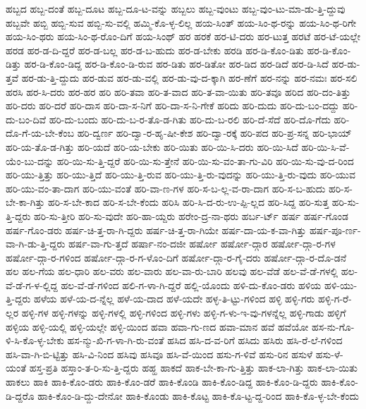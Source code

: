 {ಹಬ್ಬದ
ಹಬ್ಬ-ದಂತೆ
ಹಬ್ಬ-ದೂಟ
ಹಬ್ಬ-ದೂ-ಟ-ವನ್ನು
ಹಬ್ಬಲು
ಹಬ್ಬ-ವುಂಟು
ಹಬ್ಬ-ವುಂ-ಟು-ಮಾ-ಡು-ತ್ತಿ-ದ್ದುವು
ಹಬ್ಬವೇ
ಹಬ್ಬಿ
ಹಬ್ಬಿ-ಸುವ
ಹಬ್ಬಿ-ಸು-ವಲ್ಲಿ
ಹಮ್ಮಿ-ಕೊ-ಳ್ಳ-ಲಿಲ್ಲ
ಹಯ-ಸಿಂತ್
ಹಯ-ಸಿಂ-ಥ-ರನ್ನು
ಹಯ-ಸಿಂ-ಥ-ರಿಗೇ
ಹಯ-ಸಿಂ-ಥರು
ಹಯ-ಸಿಂ-ಥ-ರೊಂ-ದಿಗೆ
ಹಯ-ಸಿಂಥ್
ಹರ
ಹರಕೆ
ಹರ-ಟಿ-ದರು
ಹರ-ಟುತ್ತ
ಹರಟೆ
ಹರ-ಟೆ-ಯಲ್ಲೇ
ಹರಡ
ಹರ-ಡ-ದಿ-ದ್ದರೆ
ಹರ-ಡ-ಬಲ್ಲ
ಹರ-ಡ-ಬ-ಹುದು
ಹರ-ಡ-ಬೇಕು
ಹರಡಿ
ಹರ-ಡಿ-ಕೊಂ-ಡಿತು
ಹರ-ಡಿ-ಕೊಂ-ಡಿತ್ತು
ಹರ-ಡಿ-ಕೊಂ-ಡಿದ್ದ
ಹರ-ಡಿ-ಕೊಂ-ಡಿ-ರುವ
ಹರ-ಡಿತು
ಹರ-ಡಿತೋ
ಹರ-ಡಿದ
ಹರ-ಡಿದೆ
ಹರ-ಡಿ-ಸಿದೆ
ಹರ-ಡು-ತ್ತವೆ
ಹರ-ಡು-ತ್ತಿ-ದ್ದುದು
ಹರ-ಡುವ
ಹರ-ಡು-ವಲ್ಲಿ
ಹರ-ಡು-ವು-ದ-ಕ್ಕಾಗಿ
ಹರ-ಣೆಗೆ
ಹರ-ನನ್ನು
ಹರ-ನಮಃ
ಹರ-ಸಲಿ
ಹರಸಿ
ಹರ-ಸಿ-ದರು
ಹರ-ಹರ
ಹರಿ
ಹರಿ-ತವಾ
ಹರಿ-ತ-ವಾದ
ಹರಿ-ತ-ವಾ-ಯಿತು
ಹರಿ-ತವೂ
ಹರಿದ
ಹರಿ-ದಂ-ತಿತ್ತು
ಹರಿ-ದರು
ಹರಿ-ದರೆ
ಹರಿ-ದಾಸ
ಹರಿ-ದಾ-ಸ-ನಿಗೆ
ಹರಿ-ದಾ-ಸ-ನಿ-ಗೇಕೆ
ಹರಿದು
ಹರಿ-ದುದು
ಹರಿ-ದು-ಬಂ-ದದ್ದು
ಹರಿ-ದು-ಬಂ-ದಿವೆ
ಹರಿ-ದು-ಬಂದು
ಹರಿ-ದು-ಬ-ರ-ತೊ-ಡ-ಗಿತು
ಹರಿ-ದು-ಬ-ರಲಿ
ಹರಿ-ದೆ-ಸೆದೆ
ಹರಿ-ದೊ-ಗೆದು
ಹರಿ-ದೊ-ಗೆ-ಯ-ಬೇ-ಕೆಂಬ
ಹರಿ-ದ್ವರ್ಣ
ಹರಿ-ದ್ವಾ-ರ-ಹೃ-ಷೀ-ಕೇಶ
ಹರಿ-ದ್ವಾ-ರಕ್ಕೆ
ಹರಿ-ಪದ
ಹರಿ-ಪ್ರ-ಸನ್ನ
ಹರಿ-ಭಾಯ್
ಹರಿ-ಯ-ತೊ-ಡ-ಗಿತ್ತು
ಹರಿ-ಯದೆ
ಹರಿ-ಯ-ಬೇಕು
ಹರಿ-ಯಿತು
ಹರಿ-ಯಿ-ಸಿ-ದರು
ಹರಿ-ಯಿ-ಸಿದೆ
ಹರಿ-ಯಿ-ಸಿ-ವೆ-ಯೆಂ-ಬು-ದನ್ನು
ಹರಿ-ಯಿ-ಸು-ತ್ತಿ-ದ್ದರೆ
ಹರಿ-ಯಿ-ಸು-ತ್ತೇನೆ
ಹರಿ-ಯಿ-ಸು-ವಂ-ತಾ-ಗು-ವಿರಿ
ಹರಿ-ಯಿ-ಸು-ವು-ದ-ರಿಂದ
ಹರಿ-ಯು-ತ್ತಿತ್ತು
ಹರಿ-ಯು-ತ್ತಿದೆ
ಹರಿ-ಯು-ತ್ತಿ-ರುವ
ಹರಿ-ಯು-ತ್ತಿ-ರು-ವುದನ್ನು
ಹರಿ-ಯು-ತ್ತಿ-ರು-ವುದು
ಹರಿ-ಯುವ
ಹರಿ-ಯು-ವಂ-ತಾ-ದಾಗ
ಹರಿ-ಯು-ವಂತೆ
ಹರಿ-ವಾ-ಣ-ಗಳ
ಹರಿ-ಸ-ಬ-ಲ್ಲ-ವ-ರಾ-ದಾಗ
ಹರಿ-ಸ-ಬ-ಹುದು
ಹರಿ-ಸ-ಬೇ-ಕಾ-ಗಿತ್ತು
ಹರಿ-ಸ-ಬೇ-ಕಾದ
ಹರಿ-ಸ-ಬೇ-ಕೆಂದು
ಹರಿಸಿ
ಹರಿ-ಸಿ-ದ-ರು-ಉ-ಪ್ಪಿ-ಲ್ಲದ
ಹರಿ-ಸಿದ್ದ
ಹರಿ-ಸುತ್ತ
ಹರಿ-ಸು-ತ್ತಿ-ದ್ದರು
ಹರಿ-ಸು-ತ್ತೀರಿ
ಹರಿ-ಸು-ವುದೇ
ಹರಿ-ಹಾ-ಯ್ದರು
ಹರೇಂ-ದ್ರ-ನಾ-ಥರು
ಹರ್ಬ-ರ್ಟ್
ಹರ್ಷ
ಹರ್ಷ-ಗೊಂಡ
ಹರ್ಷ-ಗೊಂ-ಡರು
ಹರ್ಷ-ಚಿ-ತ್ತ-ರಾ-ಗಿ-ದ್ದರು
ಹರ್ಷ-ಚಿ-ತ್ತ-ರಾ-ಗಿಯೇ
ಹರ್ಷ-ದಾ-ಯ-ಕ-ವಾ-ಗಿತ್ತು
ಹರ್ಷ-ಪೂ-ರ್ಣ-ವಾ-ಗಿ-ಡು-ತ್ತಿ-ದ್ದರು
ಹರ್ಷ-ವಾ-ಗು-ತ್ತದೆ
ಹರ್ಷಾ-ನಂ-ದಜೀ
ಹರ್ಷೋ
ಹರ್ಷೋ-ದ್ಗಾರ
ಹರ್ಷೋ-ದ್ಗಾ-ರ-ಗಳ
ಹರ್ಷೋ-ದ್ಗಾ-ರ-ಗಳಿಂದ
ಹರ್ಷೋ-ದ್ಗಾ-ರ-ಗ-ಳೊಂ-ದಿಗೆ
ಹರ್ಷೋ-ದ್ಗಾ-ರ-ಗೈ-ದರು
ಹರ್ಷೋ-ದ್ಗಾ-ರ-ದೊ-ಡನೆ
ಹಲ
ಹಲ-ಗೆಯ
ಹಲ-ಧಾರಿ
ಹಲ-ವರು
ಹಲ-ವಾರು
ಹಲ-ವಾ-ರು-ಬಾರಿ
ಹಲವು
ಹಲ-ವೆಡೆ
ಹಲ-ವೆ-ಡೆ-ಗಳಲ್ಲಿ
ಹಲ-ವೆ-ಡೆ-ಗ-ಳ-ಲ್ಲಿದ್ದ
ಹಲ-ವೆ-ಡೆ-ಗಳಿಂದ
ಹಲಿ-ಗ-ಳಾ-ಗಿ-ದ್ದರೆ
ಹಲ್ಲಿ-ಯೊಂದು
ಹಳಿ-ದು-ಕೊಂ-ಡರು
ಹಳಿಯ
ಹಳಿ-ಯು-ತ್ತಿ-ದ್ದರು
ಹಳೆಯ
ಹಳೆ-ಯ-ದ-ನ್ನೆಲ್ಲ
ಹಳೆ-ಯ-ದಾದ
ಹಳೆ-ಯದೇ
ಹಳ್ಳ-ತಿ-ಟ್ಟು-ಗಳಿಂದ
ಹಳ್ಳಿ
ಹಳ್ಳಿ-ಗರು
ಹಳ್ಳಿ-ಗ-ರೆ-ಲ್ಲರ
ಹಳ್ಳಿ-ಗಳ
ಹಳ್ಳಿ-ಗಳನ್ನು
ಹಳ್ಳಿ-ಗಳಲ್ಲಿ
ಹಳ್ಳಿ-ಗಳಿಂದ
ಹಳ್ಳಿ-ಗಳು
ಹಳ್ಳಿ-ಗ-ಳು-ಇ-ವು-ಗಳನ್ನೆಲ್ಲ
ಹಳ್ಳಿ-ಗಾಡು
ಹಳ್ಳಿಗೆ
ಹಳ್ಳಿಯ
ಹಳ್ಳಿ-ಯಲ್ಲಿ
ಹಳ್ಳಿ-ಯಲ್ಲೇ
ಹಳ್ಳಿ-ಯಿಂದ
ಹವಾ
ಹವಾ-ಗು-ಣದ
ಹವಾ-ಮಾನ
ಹವೆ
ಹವೆಯೋ
ಹಸ-ನು-ಗೊ-ಳಿ-ಸಿ-ಕೊ-ಳ್ಳ-ಬೇಕು
ಹಸ-ನ್ಮು-ಖಿ-ಗ-ಳಾ-ಗಿ-ರು-ವಂತೆ
ಹಸಿದ
ಹಸಿ-ದ-ವ-ರಿಗೆ
ಹಸಿದು
ಹಸಿರು
ಹಸಿ-ರೆ-ಲೆ-ಗಳಿಂದ
ಹಸಿ-ವಾ-ಗಿ-ಬಿ-ಟ್ಟಿತ್ತು
ಹಸಿ-ವಿ-ನಿಂದ
ಹಸಿವು
ಹಸಿವೂ
ಹಸಿ-ವೆ-ಯಿಂದ
ಹಸು-ಗ-ಳಿವೆ
ಹಸು-ರಿನ
ಹಸುಳೆ
ಹಸು-ಳೆ-ಯಂತೆ
ಹಸ್ತ-ಪ್ರತಿ
ಹಸ್ತಾಂ-ತ-ರಿ-ಸು-ತ್ತಿ-ದ್ದರು
ಹಹ್ಹ
ಹಾಕದೆ
ಹಾಕ-ಬೇ-ಕಾ-ಗು-ತ್ತಿತ್ತು
ಹಾಕ-ಲಾ-ಗಿತ್ತು
ಹಾಕ-ಲಾ-ಯಿತು
ಹಾಕಲು
ಹಾಕಿ
ಹಾಕಿ-ಕೊಂ-ಡರು
ಹಾಕಿ-ಕೊಂ-ಡರೆ
ಹಾಕಿ-ಕೊಂಡಿ
ಹಾಕಿ-ಕೊಂ-ಡಿದ್ದ
ಹಾಕಿ-ಕೊಂ-ಡಿ-ದ್ದರು
ಹಾಕಿ-ಕೊಂ-ಡಿ-ದ್ದರೊ
ಹಾಕಿ-ಕೊಂ-ಡಿ-ದ್ದು-ದೇನೋ
ಹಾಕಿ-ಕೊಂಡು
ಹಾಕಿ-ಕೊಟ್ಟ
ಹಾಕಿ-ಕೊ-ಟ್ಟ-ದ್ದ-ರಿಂದ
ಹಾಕಿ-ಕೊ-ಳ್ಳ-ಬೇ-ಕೆಂದು
}
